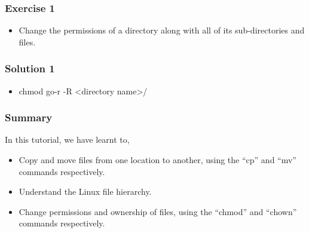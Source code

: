 \documentclass[12pt,compress]{beamer}
\begin{document}
\begin{frame}
  \frametitle{Exercise 1}
  \begin{itemize}
  \item Change the permissions of a directory along with all of its
        sub-directories and files.
  \end{itemize}
\end{frame}

\begin{frame}
  \frametitle{Solution 1}
  \begin{itemize}
  \item chmod go-r -R <directory name>/
  \end{itemize}
\end{frame}

\begin{frame}
\frametitle{Summary}
\label{sec-8}

  In this tutorial, we have learnt to,


\begin{itemize}
\item Copy and move files from one location to another, using the ``cp'' 
      and ``mv'' commands respectively.
\item Understand the Linux file hierarchy.
\item Change permissions and ownership of files, using the ``chmod''
      and ``chown'' commands respectively.
\end{itemize}
\end{frame}
\end{document}
